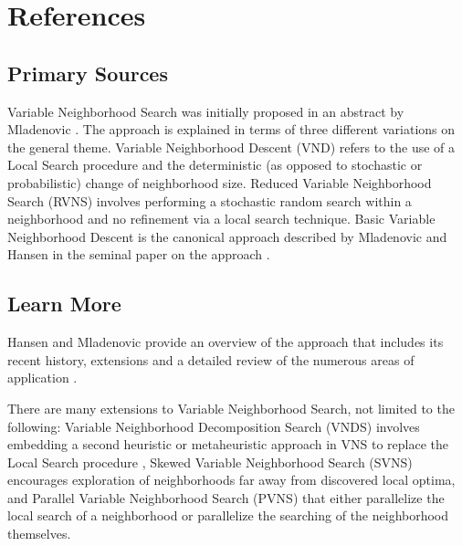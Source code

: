 \documentclass[a4paper, 11pt]{article}
\begin{document}
\section{References}
\label{sec:references}

% 
% 
\subsection{Primary Sources}
Variable Neighborhood Search was initially proposed in an abstract by Mladenovic \cite{Mladenovic1995}.
The approach is explained in terms of three different variations on the general theme. Variable Neighborhood Descent (VND) refers to the use of a Local Search procedure and the deterministic (as opposed to stochastic or probabilistic) change of neighborhood size. Reduced Variable Neighborhood Search (RVNS) involves performing a stochastic random search within a neighborhood and no refinement via a local search technique. Basic Variable Neighborhood Descent is the canonical approach described by Mladenovic and Hansen in the seminal paper on the approach \cite{Mladenovic1997}.

% 
% 
\subsection{Learn More}
Hansen and Mladenovic provide an overview of the approach that includes its recent history, extensions and a detailed review of the numerous areas of application \cite{Hansen2003}.

There are many extensions to Variable Neighborhood Search, not limited to the following: Variable Neighborhood Decomposition Search (VNDS) involves embedding a second heuristic or metaheuristic approach in VNS to replace the Local Search procedure \cite{Hansen2001}, Skewed Variable Neighborhood Search (SVNS) encourages exploration of neighborhoods far away from discovered local optima, and Parallel Variable Neighborhood Search (PVNS) that either parallelize the local search of a neighborhood or parallelize the searching of the neighborhood themselves.
\end{document}

